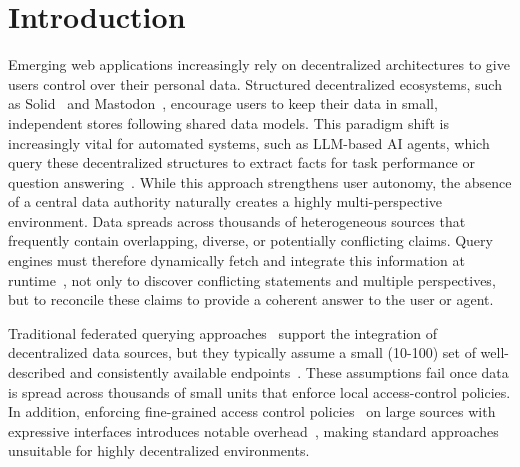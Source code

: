 \section{Introduction}
Emerging web applications increasingly rely on decentralized architectures to give users control over their personal data.
Structured decentralized ecosystems, such as Solid~\cite{sambra2016solid} and Mastodon~\cite{raman2019challenges},
encourage users to keep their data in small, independent stores following shared data models.
This paradigm shift is increasingly vital for automated systems, such as LLM-based AI agents,
which query these decentralized structures to extract facts for task performance or question answering~\cite{walter2025grasp,karki2026agentic,bernerslee2017charlie}.
While this approach strengthens user autonomy, the absence of a central data authority naturally creates a highly multi-perspective environment. 
Data spreads across thousands of heterogeneous sources that frequently contain overlapping, diverse, 
or potentially conflicting claims.
Query engines must therefore dynamically fetch and integrate this information at runtime~\cite{taelman_sigweb_queryengineshypermedia_2024}, 
not only to discover conflicting statements and multiple perspectives, 
but to reconcile these claims to provide a coherent answer to the user or agent.

Traditional federated querying approaches~\cite{schwarte2011fedx,schmidt2011fedbench,heling2022federated} support the integration of decentralized data sources,
but they typically assume a small (10-100) set of well-described and consistently available endpoints~\cite{dang2023fedshop}. 
These assumptions fail once data is spread across thousands of small units that enforce local access-control policies.
In addition, enforcing fine-grained access control policies~\cite{esteves2021odrl} on large sources with expressive interfaces introduces notable 
overhead~\cite{padia2015attribute}, making standard approaches unsuitable for highly decentralized environments.

